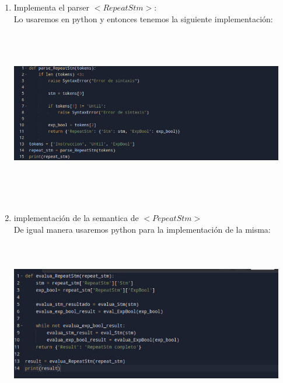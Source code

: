\documentclass[14pt]{book}
\begin{document}
\begin{enumerate}
  \item Implementa el parser $<RepeatStm>$:\\
  Lo usaremos en python y entonces tenemos la siguiente implementación:\\
  \includegraphics[width=12cm, height=8cm]{images/p1.jpeg}\\
  \item implementación de la semantica de $<PepeatStm>$\\
  De igual manera usaremos python para la implementación de la misma:\\
  \includegraphics[width=12cm, height=8cm]{images/WhatsApp Image 2023-12-06 at 11.39.25 PM.jpeg}\\
\end{enumerate}
\end{document}
